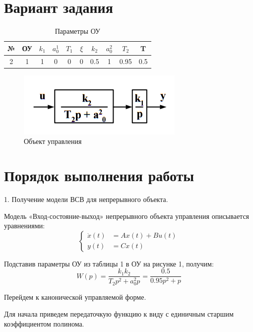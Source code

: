 \documentclass[a4paper,14pt]{extreport}
\begin{document}
\section{Вариант задания}

\begin{table}[H]
	\centering
	\caption{Параметры ОУ}
	\label{my-label}
	\begin{tabular}{|c|c|c|c|c|c|c|c|c|c|}
		\hline
		№ & ОУ & $k_1$ & $a_0^1$ & $T_1$ & $\xi$ & $k_2$ & $a_0^2$ & $T_2$ & T   \\ \hline
		2 & 1  & 1     & 0       & 0     & 0     & 0.5   & 1       & 0.95  & 0.5 \\ \hline
	\end{tabular}
\end{table}

\begin{figure}[H]
	\center\includegraphics[width=0.5\linewidth]{oc.png}
	\caption{Объект управления}
	\label{fig:scr1}
\end{figure}

\section{Порядок выполнения работы}

1. Получение модели ВСВ для непрерывного объекта.

Модель «Вход-состояние-выход» непрерывного объекта управления описывается уравнениями:
\begin{equation}
	\begin{cases}
	\dot x(t) &= A x(t) + B u(t)\\
	y(t) &= C x(t)
	\end{cases}
\end{equation}

Подставив параметры ОУ из таблицы 1 в ОУ на рисунке 1, получим:
\begin{equation}
	W(p) = \frac{k_1 k_2}{T_2 p^2 + a_0^2 p} = \frac{0.5}{0.95 p^2 + p} 
\end{equation}

Перейдем к канонической управляемой форме.

Для начала приведем передаточкую функцию к виду с единичным старшим коэффициентом полинома.
\end{document}
